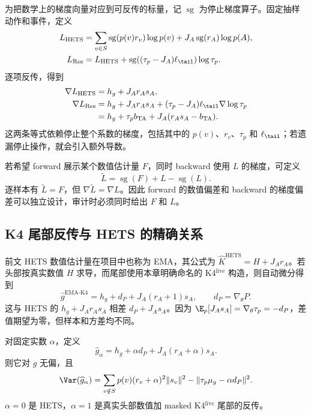 为把数学上的梯度向量对应到可反传的标量，记 $\operatorname{sg}$ 为停止梯度算子。固定抽样动作和事件，定义
\begin{align*}
 L_{\mathrm{HETS}}
 &=\sum_{v\in S}\operatorname{sg}(p(v)r_v)\log p(v)
   +J_A\operatorname{sg}(r_A)\log p(A),\\
 L_{\mathrm{Res}}
 &=L_{\mathrm{HETS}}
   +\operatorname{sg}((\tau_p-J_A)\ell_{\tail})\log\tau_p.
\end{align*}
逐项反传，得到
\begin{align*}
 \nabla L_{\mathrm{HETS}}&=h_g+J_Ar_As_A,\\
 \nabla L_{\mathrm{Res}}
 &=h_g+J_Ar_As_A+(\tau_p-J_A)\ell_{\tail}\nabla\log\tau_p\\
 &=h_g+\tau_pb_{\mathrm{TA}}+J_A(r_As_A-b_{\mathrm{TA}}).
\end{align*}
这两条等式依赖停止整个系数的梯度，包括其中的 $p(v)$、$r_v$、$\tau_p$ 和 $\ell_{\tail}$；若遗漏停止操作，就会引入额外导数。

若希望 forward 展示某个数值估计量 $F$，同时 backward 使用 $L$ 的梯度，可定义
\[
 \widetilde L=\operatorname{sg}(F)+L-\operatorname{sg}(L).
\]
逐样本有 $\widetilde L=F$，但 $\nabla\widetilde L=\nabla L$。因此 forward 的数值偏差和 backward 的梯度偏差可以独立设计，审计时必须同时给出 $F$ 和 $L$。

\subsection{K4 尾部反传与 HETS 的精确关系}
\label{sec:kl-k4-hets}

前文 HETS 数值估计量在项目中也称为 EMA，其公式为 $\widehat K^{\mathrm{HETS}}=H+J_Ar_A$。若头部按真实数值 $H$ 求导，而尾部使用本章明确命名的 K4$^{\mathrm{live}}$ 构造，则自动微分得到
\[
 \widehat g^{\mathrm{EMA\text{-}K4}}
 =h_g+d_P+J_A(r_A+1)s_A,\qquad d_P=\nabla_\theta P.
\]
这与 HETS 的 $h_g+J_Ar_As_A$ 相差 $d_P+J_As_A$。因为 $\E_p[J_As_A]=\nabla_\theta\tau_p=-d_P$，差值期望为零，但样本和方差均不同。

\begin{theorem}
对固定实数 $\alpha$，定义
\[
 \widehat g_\alpha
 =h_g+\alpha d_P+J_A(r_A+\alpha)s_A.
\]
则它对 $g$ 无偏，且
\begin{equation}
 \Var(\widehat g_\alpha)
 =\sum_{v\notin S}p(v)(r_v+\alpha)^2\lVert s_v\rVert^2
  -\lVert\tau_p\mu_g-\alpha d_P\rVert^2.
 \label{eq:kl-alpha-var}
\end{equation}
$\alpha=0$ 是 HETS，$\alpha=1$ 是真实头部数值加 masked K4$^{\mathrm{live}}$ 尾部的反传。
\end{theorem}


